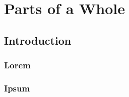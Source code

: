 \documentclass{report}
\begin{document}

\toc

\part{Parts of a Whole}

\chapter{Introduction}

\section{Lorem}
\lipsum[1]

\section{Ipsum}
\lipsum[1]
\end{document}
